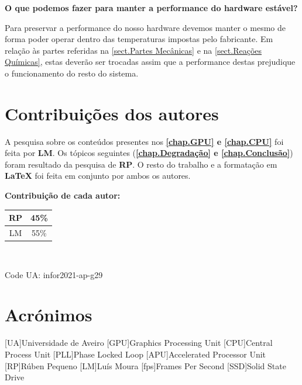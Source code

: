 \documentclass{report}
\begin{document}
	\begin{Large}
		\textbf{O que podemos fazer para manter a performance do hardware estável?}\\
	\end{Large}
	Para preservar a performance do nosso hardware devemos manter o mesmo de forma poder operar dentro das temperaturas impostas pelo fabricante. Em relação às partes referidas na \autoref{sect.Partes Mecânicas} e na \autoref{sect.Reações Químicas}, estas deverão ser trocadas assim que a performance destas prejudique o funcionamento do resto do sistema.
	
	
\chapter*{Contribuições dos autores}
 A pesquisa sobre os conteúdos presentes nos \textbf{\autoref{chap.GPU} e \ref{chap.CPU}} foi feita por \textbf{\ac{LM}}. Os tópicos seguintes (\textbf{\autoref{chap.Degradação} e \ref{chap.Conclusão}}) foram resultado da pesquisa de \textbf{\ac{RP}}. O resto do trabalho e a formatação em \textbf{\LaTeX}  foi feita em conjunto por ambos os autores.\\
\begin{center}
	\Large{\textbf{Contribuição de cada autor:}}\\
	\begin{tabular}{|c|c|}
	\hline
	\ac{RP} & 45\%\\ \hline
	\ac{LM} & 55\%\\ \hline
	\end{tabular}\\
	\vspace{1cm}
	\begin{large}
		Code UA: infor2021-ap-g29
	\end{large}
\end{center}

\chapter*{Acrónimos}
\begin{acronym}
[UA]{Universidade de Aveiro}
[GPU]{Graphics Processing Unit}
[CPU]{Central Process Unit}
[PLL]{Phase Locked Loop}
[APU]{Accelerated Processor Unit}
[RP]{Rúben Pequeno}
[LM]{Luís Moura}
[fps]{Frames Per Second}
[SSD]{Solid State Drive}
\end{acronym}

\printbibliography
\end{document}
